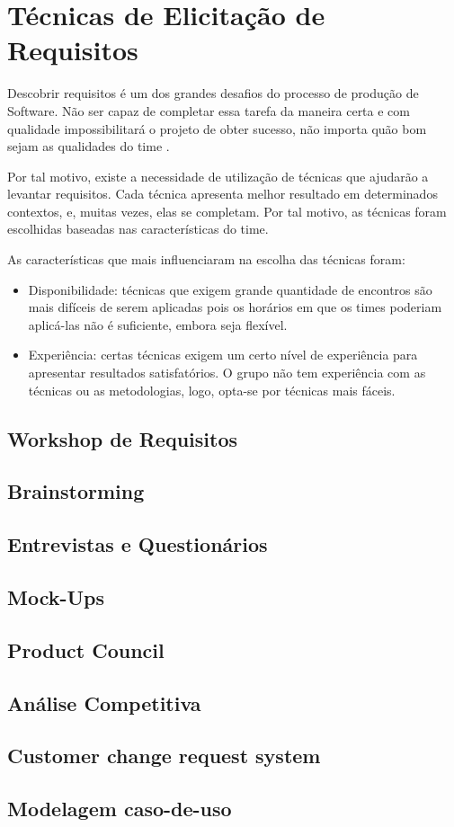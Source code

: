 \chapter[Técnicas de Elicitação de Requisitos]{Técnicas de Elicitação de Requisitos}
Descobrir requisitos é um dos grandes desafios do processo de produção de Software. Não ser capaz de completar essa tarefa da maneira certa e com qualidade impossibilitará o projeto de obter sucesso, não importa quão bom sejam as qualidades do time \cite[p. 227-228]{safe001}.

Por tal motivo, existe a necessidade de utilização de técnicas que ajudarão a levantar requisitos. Cada técnica apresenta melhor resultado em determinados contextos, e, muitas vezes, elas se completam. Por tal motivo, as técnicas foram escolhidas baseadas nas características do time.

As características que mais influenciaram na escolha das técnicas foram:
\begin{itemize}
  \item Disponibilidade: técnicas que exigem grande quantidade de encontros são mais difíceis de serem aplicadas pois os horários em que os times poderiam aplicá-las não é suficiente, embora seja flexível.
  \item Experiência: certas técnicas exigem um certo nível de experiência para apresentar resultados satisfatórios. O grupo não tem experiência com as técnicas ou as metodologias, logo, opta-se por técnicas mais fáceis.
\end{itemize}

\section{Workshop de Requisitos}

\section{Brainstorming}

\section{Entrevistas e Questionários}

\section{Mock-Ups}

\section{Product Council}

\section{Análise Competitiva}

\section{Customer change request system}

\section{Modelagem caso-de-uso}
